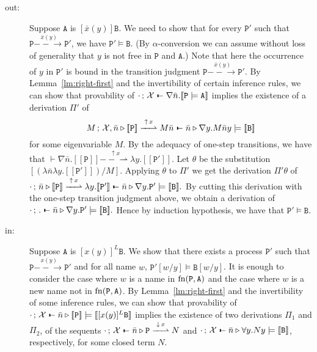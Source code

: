 \documentclass{acmtrans2m}
\newcommand \mBox[1] {[#1]}
\newcommand \stf[2] {#1 \models #2}
\def\Xscr{{\mathcal X}}
\def\Api{{\mathtt A}}
\def\Bpi{{\mathtt B}}
\def\Ppi{{\mathtt P}}
\def\relbar{\mathrel{\smash-}}
\def\joinrelm{\mathrel{\mkern-3.2mu}}
\def\tailpiece{\kern 1pt\vrule height 1ex width 0.3ex depth -.25ex}
\def\seqsym{\mathrel{\tailpiece\joinrelm\relbar}}
\newcommand{\Judg}[2]{#1\triangleright#2}
\newcommand{\NSeq}[3]{#1\,;\,#2 \seqsym #3}
\newcommand{\inact}{\mathop{\downarrow}}
\newcommand{\one  }[3]{#1\stackrel{#2}{-\!\!-\!\!\!\rightarrow    } #3}
\newcommand{\onep }[3]{#1\stackrel{#2}{-\!\!-\!\!\!\rightharpoonup} #3}
\newcommand{\outact}{\mathop{\uparrow}}
\newcommand{\trans}[1]{[\![ #1 ]\!]}
\newcommand{\fn}[1]{{\rm fn}(#1)}
\begin{document}
\begin{description}

\item[out:] Suppose $\Api$ is $\mBox{\bar x(y)}\Bpi$. We need to show that for every
$\Ppi'$ such that $\one \Ppi {\bar x (y)} \Ppi'$, we have $\stf {\Ppi'} \Bpi.$ 
(By $\alpha$-conversion we can assume without loss of generality that 
$y$ is not free in $\Ppi$ and $\Api$.) Note that here the occurrence of $y$ in $\Ppi'$ is bound 
in the transition judgment $\one \Ppi {\bar x(y)} {\Ppi'}$.
By Lemma~\ref{lm:right-first} and the invertibility of certain inference rules, we can
show that provability of $\NSeq{\cdot}{\Xscr}{\nabla \bar n. \trans{\stf \Ppi \Api}}$
implies the existence of a derivation $\Pi'$ of 
$$
  \NSeq{M}{\Xscr, \Judg{\bar n}{\onep{\trans \Ppi}{\outact x}{M\bar n}}}
   {\Judg{\bar n}{\nabla y.\stf{M\bar n y}{\trans \Bpi}}}
$$
for some eigenvariable $M$. 
By the adequacy of one-step transitions, we have that 
$\vdash \nabla \bar n. \onep{\trans \Ppi}{\outact x}{\lambda y.\trans {\Ppi'}}$.
Let $\theta$ be the substitution $[(\lambda \bar n\lambda y.\trans {\Ppi'})/M].$
Applying $\theta$ to $\Pi'$ we get the derivation $\Pi'\theta$ of
$
\NSeq{\cdot}{\Judg{\bar n}{\onep{\trans \Ppi}{\outact x}{\lambda y.\trans {\Ppi'}}}}
{\Judg{\bar n}{\nabla y.\stf{\Ppi'}{\trans \Bpi}}}.
$
By cutting this derivation with the one-step transition judgment above, we obtain
a derivation of 
$
\NSeq{\cdot}{.}{\Judg{\bar n}{\nabla y.\stf{\Ppi'}{\trans \Bpi}}}.
$
Hence by induction hypothesis, we have that $\stf {\Ppi'} \Bpi$.

\item[in:] Suppose $\Api$ is $\mBox{x(y)}^L \Bpi$. We show that there exists
a process $\Ppi'$ such that $\one \Ppi {x(y)} \Ppi'$ and
for all name $w$, $\stf {\Ppi'[w/y]} {\Bpi[w/y]}$. It is enough to consider
the case where $w$ is a name in $\fn{\Ppi,\Api}$ and the case where $w$
is a new name not in $\fn{\Ppi,\Api}$. By Lemma~\ref{lm:right-first} and the invertibility
of some inference rules, we can show that provability of 
$
\NSeq{\cdot}{\Xscr}{\Judg{\bar n}{\stf{\trans \Ppi}{\trans{\mBox{x(y)}^L \Bpi}}} }
$
implies the existence of two derivations $\Pi_1$ and $\Pi_2$, of the sequents
$\NSeq{\cdot}{\Xscr}{\Judg{\bar n}{\onep \Ppi {\inact x} {N}}}$
and 
$\NSeq{\cdot}{\Xscr}{\Judg{\bar n}{\forall y. \stf {N y} {\trans{\Bpi}}}}$,
respectively, for some closed term $N$.


\end{description}
\end{document}
